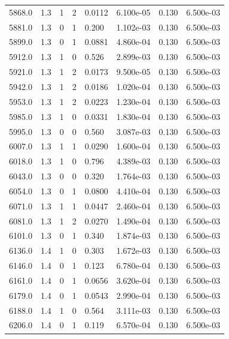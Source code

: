 \documentclass[preview]{standalone}
\begin{document}
{{{{{{{{{{{\begin{tabular}{L{1.2cm}C{1.2cm} C{0.3cm}C{0.5cm} C{1.4cm}C{1.4cm} C{1.4cm}C{1.4cm}}
  5868.0  &   1.3  & 1     &  2 &  0.0112  & 6.100e-05  & 0.130 &  6.500e-03   \\ 
  5881.0  &   1.3  & 0     &  1 &  0.200  & 1.102e-03  & 0.130 &  6.500e-03   \\ 
  5899.0  &   1.3  & 0     &  1 &  0.0881  & 4.860e-04  & 0.130 &  6.500e-03   \\ 
  5912.0  &   1.3  & 1     &  0 &  0.526  & 2.899e-03  & 0.130 &  6.500e-03   \\ 
  5921.0  &   1.3  & 1     &  2 &  0.0173  & 9.500e-05  & 0.130 &  6.500e-03   \\ 
  5942.0  &   1.3  & 1     &  2 &  0.0186  & 1.020e-04  & 0.130 &  6.500e-03   \\ 
  5953.0  &   1.3  & 1     &  2 &  0.0223  & 1.230e-04  & 0.130 &  6.500e-03   \\ 
  5985.0  &   1.3  & 1     &  0 &  0.0331  & 1.830e-04  & 0.130 &  6.500e-03   \\ 
  5995.0  &   1.3  & 0     &  0 &  0.560  & 3.087e-03  & 0.130 &  6.500e-03   \\ 
  6007.0  &   1.3  & 1     &  1 &  0.0290  & 1.600e-04  & 0.130 &  6.500e-03   \\ 
  6018.0  &   1.3  & 1     &  0 &  0.796  & 4.389e-03  & 0.130 &  6.500e-03   \\ 
  6043.0  &   1.3  & 0     &  0 &  0.320  & 1.764e-03  & 0.130 &  6.500e-03   \\ 
  6054.0  &   1.3  & 0     &  1 &  0.0800  & 4.410e-04  & 0.130 &  6.500e-03   \\ 
  6071.0  &   1.3  & 1     &  1 &  0.0447  & 2.460e-04  & 0.130 &  6.500e-03   \\ 
  6081.0  &   1.3  & 1     &  2 &  0.0270  & 1.490e-04  & 0.130 &  6.500e-03   \\ 
  6101.0  &   1.3  & 0     &  1 &  0.340  & 1.874e-03  & 0.130 &  6.500e-03   \\ 
  6136.0  &   1.4  & 1     &  0 &  0.303  & 1.672e-03  & 0.130 &  6.500e-03   \\ 
  6146.0  &   1.4  & 0     &  1 &  0.123  & 6.780e-04  & 0.130 &  6.500e-03   \\ 
  6161.0  &   1.4  & 0     &  1 &  0.0656  & 3.620e-04  & 0.130 &  6.500e-03   \\ 
  6179.0  &   1.4  & 0     &  1 &  0.0543  & 2.990e-04  & 0.130 &  6.500e-03   \\ 
  6188.0  &   1.4  & 1     &  0 &  0.564  & 3.111e-03  & 0.130 &  6.500e-03   \\ 
  6206.0  &   1.4  & 0     &  1 &  0.119  & 6.570e-04  & 0.130 &  6.500e-03   \\ 

\end{tabular}}}}}}}}}}}}
\end{document}
